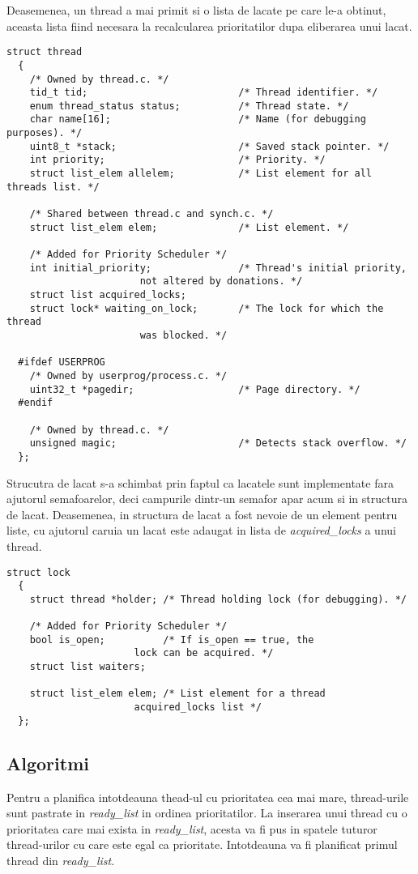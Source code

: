\documentclass[a4paper,12pt]{report}
\begin{document}
Deasemenea, un thread a mai primit si o lista de lacate pe care le-a obtinut, aceasta lista fiind necesara la
recalcularea prioritatilor dupa eliberarea unui lacat.
\begin{lstlisting}
struct thread
  {
    /* Owned by thread.c. */
    tid_t tid;                          /* Thread identifier. */
    enum thread_status status;          /* Thread state. */
    char name[16];                      /* Name (for debugging purposes). */
    uint8_t *stack;                     /* Saved stack pointer. */
    int priority;                       /* Priority. */
    struct list_elem allelem;           /* List element for all threads list. */

    /* Shared between thread.c and synch.c. */
    struct list_elem elem;              /* List element. */
     
    /* Added for Priority Scheduler */
    int initial_priority;               /* Thread's initial priority, 
					   not altered by donations. */
    struct list acquired_locks;
    struct lock* waiting_on_lock;       /* The lock for which the thread 
					   was blocked. */

  #ifdef USERPROG
    /* Owned by userprog/process.c. */
    uint32_t *pagedir;                  /* Page directory. */
  #endif

    /* Owned by thread.c. */
    unsigned magic;                     /* Detects stack overflow. */
  };
\end{lstlisting}

Strucutra de lacat s-a schimbat prin faptul ca lacatele sunt implementate fara ajutorul semafoarelor, deci campurile
dintr-un semafor apar acum si in structura de lacat. Deasemenea, in structura de lacat a fost nevoie de un
element pentru liste, cu ajutorul caruia un lacat este adaugat in lista de \textit{acquired\_locks} a unui thread.

\begin{lstlisting}
struct lock 
  {
    struct thread *holder; /* Thread holding lock (for debugging). */

    /* Added for Priority Scheduler */
    bool is_open;          /* If is_open == true, the 
		              lock can be acquired. */
    struct list waiters;

    struct list_elem elem; /* List element for a thread 
		              acquired_locks list */
  };
\end{lstlisting}


\subsection{Algoritmi}
Pentru a planifica intotdeauna thead-ul cu prioritatea cea mai mare, thread-urile sunt pastrate in \textit{ready\_list}
in ordinea prioritatilor. La inserarea unui thread cu o prioritatea care mai exista in \textit{ready\_list}, acesta va
fi pus in spatele tuturor thread-urilor cu care este egal ca prioritate. Intotdeauna va fi planificat primul thread din 
\textit{ready\_list}.
\end{document}
